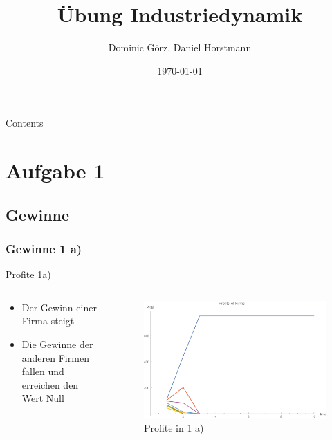 \documentclass[xcolor={dvipsnames},10pt]{beamer}
\title[Industriedynamik]{Übung Industriedynamik}
\author{Dominic Görz, Daniel Horstmann}
\date{\today}
\begin{document}
\begin{frame}
  \maketitle
\end{frame}

\begin{frame}{Contents}
  \tableofcontents
\end{frame}

\section{Aufgabe 1}

\subsection{Gewinne}

\subsubsection{Gewinne 1 a)}
\begin{frame}{Profite 1a)}
\begin{columns}[T]
    \begin{column}{.3\textwidth}
      \begin{itemize}
      \item Der Gewinn einer Firma steigt
      \item Die Gewinne der anderen Firmen fallen und erreichen den Wert Null
      \end{itemize}
      \end{column}
      \begin{column}{.7\textwidth}
      \begin{figure}[t]
            \centering
            \includegraphics[scale=0.35]{../Plots/profit1a}
            \caption{Profite in 1 a)}
            \label{fig:profit1a}
       \end{figure}
    \end{column}
  \end{columns}
\end{frame}
\end{document}
